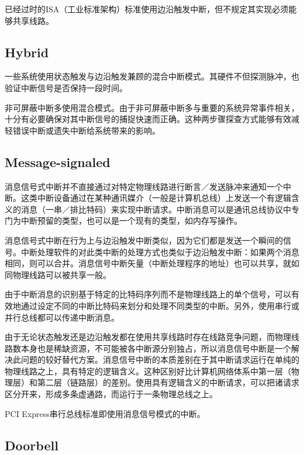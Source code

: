 已经过时的ISA（工业标准架构）标准使用边沿触发中断，但不规定其实现必须能够共享线路。


\subsection{Hybrid}


一些系统使用状态触发与边沿触发兼顾的混合中断模式。其硬件不但探测脉冲，也验证中断信号是否保持一段时间。

非可屏蔽中断多使用混合模式。由于非可屏蔽中断多与重要的系统异常事件相关，十分有必要确保对其中断信号的捕捉快速而正确。这种两步骤探查方式能够有效减轻错误中断或遗失中断给系统带来的影响。


\subsection{Message-signaled}


消息信号式中断并不直接通过对特定物理线路进行断言／发送脉冲来通知一个中断。这类中断设备通过在某种通讯媒介（一般是计算机总线）上发送一个有逻辑含义的消息（一串／排比特码）来实现中断请求。中断消息可以是通讯总线协议中专门为中断预留的类型，也可以是一个现有的类型，如内存写操作。

消息信号式中断在行为上与边沿触发中断类似，因为它们都是发送一个瞬间的信号。中断处理软件的对此类中断的处理方式也类似于边沿触发中断：如果两个消息相同，则可以合并。消息信号中断矢量（中断处理程序的地址）也可以共享，就如同物理线路可以被共享一般。

由于中断消息的识别基于特定的比特码序列而不是物理线路上的单个信号，可以有效地通过设定不同的中断比特码来划分和处理不同类型的中断。另外，使用串行或并行总线都可以传递中断消息。

由于无论状态触发还是边沿触发都在使用共享线路时存在线路竞争问题，而物理线路数本身也是稀缺资源，不可能被各中断源分别独占，所以消息信号中断是一个解决此问题的较好替代方案。消息信号中断的本质差别在于其中断请求运行在单纯的物理线路之上，具有特定的逻辑含义。这种区别好比计算机网络体系中第一层（物理层）和第二层（链路层）的差别。使用具有逻辑含义的中断请求，可以把诸请求区分开来，形成多条虚通路，而运行于一条物理总线之上。

PCI Express串行总线标准即使用消息信号模式的中断。

\subsection{Doorbell}







